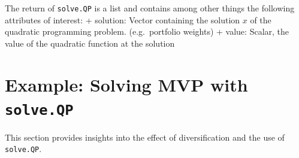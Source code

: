 \documentclass[
  oneside]{book}
\begin{document}
The return of \texttt{solve.QP} is a list and contains among other things the following attributes of interest:
+ solution: Vector containing the solution \(x\) of the quadratic programming problem. (e.g.~portfolio weights)
+ value: Scalar, the value of the quadratic function at the solution

\hypertarget{example-solving-mvp-with-solve.qp}{%
\section{\texorpdfstring{Example: Solving MVP with \texttt{solve.QP}}{Example: Solving MVP with solve.QP}}\label{example-solving-mvp-with-solve.qp}}

This section provides insights into the effect of diversification and the use of \texttt{solve.QP}.
\end{document}
